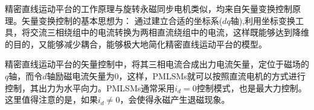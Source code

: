 精密直线运动平台的工作原理与旋转永磁同步电机类似，均来自矢量变换控制原理。矢量变换控制的基本思想为：
通过建立合适的坐标系($dq$轴),利用坐标变换工具，将交流三相绕组中的电流转换为两相直流绕组中的电流，这样既能够达到降维的目的，又能够减少耦合，能够极大地简化精密直线运动平台的模型。

精密直线运动平台的矢量控制中，将其三相电流合成出力电流矢量，定位于磁场的$q$轴，而令$d$轴励磁电流矢量为$0$，这样，PMLSMs就可以按照直流电机的方式进行控制，其出力为水平向力。PMLSMs通常采用$i_d=0$控制模式，也是最大力控制。这里值得注意的是，如果$i_d\neq0$，会使得永磁产生退磁现象。

